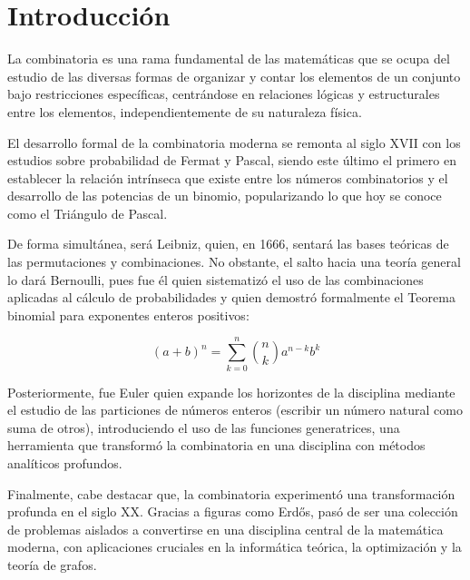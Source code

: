 \documentclass[12pt]{article}
\theoremstyle{definition}
\theoremstyle{plain}
\theoremstyle{plain}
\theoremstyle{definition}
\begin{document}


\tableofcontents

\newpage 

\pagestyle{plain} 

\section{Introducción}

La combinatoria es una rama fundamental de las matemáticas que se ocupa del estudio de las diversas formas de organizar y contar los elementos de un conjunto bajo restricciones específicas, centrándose en relaciones lógicas y estructurales entre los elementos, independientemente de su naturaleza física.

El desarrollo formal de la combinatoria moderna se remonta al siglo XVII con los estudios sobre probabilidad de Fermat y Pascal, siendo este último el primero en establecer la relación intrínseca que existe entre los números combinatorios y el desarrollo de las potencias de un binomio, popularizando lo que hoy se conoce como el Triángulo de Pascal.

De forma simultánea, será Leibniz, quien, en 1666, sentará las bases teóricas de las permutaciones y combinaciones. No obstante, el salto hacia una teoría general lo dará  Bernoulli, pues fue él quien sistematizó el uso de las combinaciones aplicadas al cálculo de probabilidades y quien demostró formalmente  el Teorema binomial para exponentes enteros positivos:

\begin{equation*}
    (a+b)^n = \sum_{k=0}^{n} \binom{n}{k} a^{n-k}b^k
\end{equation*}

Posteriormente, fue Euler quien expande los horizontes de la disciplina mediante el estudio de las particiones de números enteros (escribir un número natural como suma de otros), introduciendo el uso de las funciones generatrices, una herramienta que transformó la combinatoria en una disciplina con métodos analíticos profundos.

Finalmente, cabe destacar que, la combinatoria experimentó una transformación profunda en el siglo XX. Gracias a figuras como Erd\H{o}s, pasó de ser una  colección de problemas aislados a convertirse en una disciplina central de la matemática moderna, con aplicaciones cruciales en la informática teórica, la optimización y la teoría de grafos.
\end{document}
